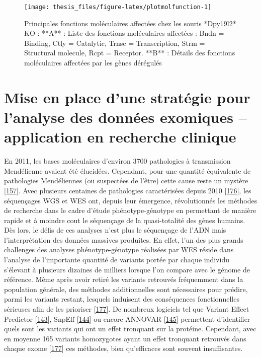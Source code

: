 \documentclass[12pt,twoside]{reedthesis}
\theoremstyle{definition}
\theoremstyle{definition}
\theoremstyle{remark}
\begin{document}
  \newpage 
  
  \begin{figure}
  
  {\centering \texttt{[image: thesis\_files/figure-latex/plotmolfunction-1]} 
  
  }
  
  \caption[Principales fonctions moléculaires affectées chez les souris *Dpy19l2* KO]{Principales fonctions moléculaires affectées chez les souris *Dpy19l2* KO  :  **A** : Liste des fonctions moléculaires affectées : Bndn = Binding, Ctly = Catalytic, Trnsc = Transcription, Strm = Structural molecule, Rcpt = Receptor. **B** : Détails des fonctions moléculaires affectées par les gènes dérégulés}\label{fig:plotmolfunction}
  \end{figure}
  
  \chapter{Mise en place d'une stratégie pour l'analyse des données
  exomiques -- application en recherche
  clinique}\label{mise-en-place-dune-strategie-pour-lanalyse-des-donnees-exomiques-application-en-recherche-clinique}
  
  \newpage
  
  En 2011, les bases moléculaires d'environ 3700 pathologies à
  transmission Mendélienne avaient été élucidées. Cependant, pour une
  quantité équivalente de pathologies Mendéliennes (ou suspectées de
  l'être) cette cause reste un mystère
  {[}\protect\hyperlink{ref-Amberger2011}{157}{]}. Avec plusieurs
  centaines de pathologies caractérisées depuis 2010
  {[}\protect\hyperlink{ref-Ng}{176}{]}, les séquençages WGS et WES ont,
  depuis leur émergence, révolutionnés les méthodes de recherche dans le
  cadre d'étude phénotype-génotype en permettant de manière rapide et à
  moindre cout le séquençage de la quasi-totalité des gènes humains. Dès
  lors, le défis de ces analyses n'est plus le séquençage de l'ADN mais
  l'interprétation des données massives produites. En effet, l'un des plus
  grands challenges des analyses phénotype-génotype réalisées par WES
  réside dans l'analyse de l'importante quantité de variants portée par
  chaque individu s'élevant à plusieurs dizaines de milliers lorsque l'on
  compare avec le génome de référence. Même après avoir retiré les
  variants retrouvés fréquemment dans la population générale, des méthodes
  additionnelles sont nécessaires pour prédire, parmi les variants
  restant, lesquels induisent des conséquences fonctionnelles sérieuses
  afin de les prioriser {[}\protect\hyperlink{ref-Pelak2010}{177}{]}. De
  nombreux logiciels tel que Variant Effect Predictor
  {[}\protect\hyperlink{ref-McLaren2016}{143}{]}, SnpEff
  {[}\protect\hyperlink{ref-Cingolani2012}{144}{]} ou encore ANNOVAR
  {[}\protect\hyperlink{ref-Wang2010}{145}{]} permettent d'identifier
  quels sont les variants qui ont un effet tronquant sur la protéine.
  Cependant, avec en moyenne 165 variants homozygotes ayant un effet
  tronquant retrouvés dans chaque exome
  {[}\protect\hyperlink{ref-Pelak2010}{177}{]} ces méthodes, bien
  qu'efficaces sont souvent insuffisantes.
  
\end{document}
